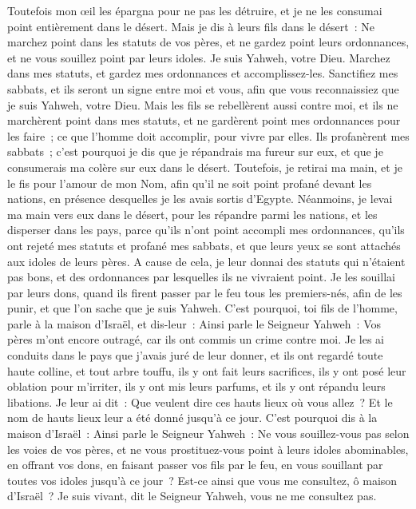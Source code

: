 \begin{multicols}{2}
Toutefois mon œil les épargna pour ne pas les détruire, et je ne les consumai point entièrement dans le désert.
Mais je dis à leurs fils dans le désert~: Ne marchez point dans les statuts de vos pères, et ne gardez point leurs ordonnances, et ne vous souillez point par leurs idoles.
Je suis Yahweh, votre Dieu. Marchez dans mes statuts, et gardez mes ordonnances et accomplissez-les.
Sanctifiez mes sabbats, et ils seront un signe entre moi et vous, afin que vous reconnaissiez que je suis Yahweh, votre Dieu.
Mais les fils se rebellèrent aussi contre moi, et ils ne marchèrent point dans mes statuts, et ne gardèrent point mes ordonnances pour les faire~; ce que l'homme doit accomplir, pour vivre par elles. Ils profanèrent mes sabbats~; c'est pourquoi je dis que je répandrais ma fureur sur eux, et que je consumerais ma colère sur eux dans le désert.
Toutefois, je retirai ma main, et je le fis pour l'amour de mon Nom, afin qu'il ne soit point profané devant les nations, en présence desquelles je les avais sortis d'Egypte.
Néanmoins, je levai ma main vers eux dans le désert, pour les répandre parmi les nations, et les disperser dans les pays,
parce qu'ils n'ont point accompli mes ordonnances, qu'ils ont rejeté mes statuts et profané mes sabbats, et que leurs yeux se sont attachés aux idoles de leurs pères.
A cause de cela, je leur donnai des statuts qui n'étaient pas bons, et des ordonnances par lesquelles ils ne vivraient point.
Je les souillai par leurs dons, quand ils firent passer par le feu tous les premiers-nés, afin de les punir, et que l'on sache que je suis Yahweh.
C'est pourquoi, toi fils de l'homme, parle à la maison d'Israël, et dis-leur~: Ainsi parle le Seigneur Yahweh~: Vos pères m'ont encore outragé, car ils ont commis un crime contre moi.
Je les ai conduits dans le pays que j'avais juré de leur donner, et ils ont regardé toute haute colline, et tout arbre touffu, ils y ont fait leurs sacrifices, ils y ont posé leur oblation pour m'irriter, ils y ont mis leurs parfums, et ils y ont répandu leurs libations.
Je leur ai dit~: Que veulent dire ces hauts lieux où vous allez~? Et le nom de hauts lieux leur a été donné jusqu'à ce jour.
C'est pourquoi dis à la maison d'Israël~: Ainsi parle le Seigneur Yahweh~: Ne vous souillez-vous pas selon les voies de vos pères, et ne vous prostituez-vous point à leurs idoles abominables,
en offrant vos dons, en faisant passer vos fils par le feu, en vous souillant par toutes vos idoles jusqu'à ce jour~? Est-ce ainsi que vous me consultez, ô maison d'Israël~? Je suis vivant, dit le Seigneur Yahweh, vous ne me consultez pas.

\end{multicols}
